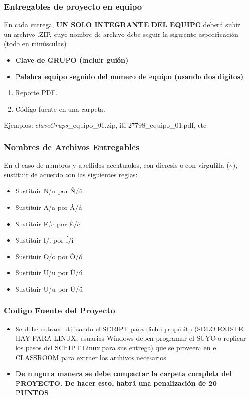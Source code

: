 \begin{frame}
\frametitle{Entregables de proyecto en equipo}
En cada entrega, \textbf{UN SOLO INTEGRANTE DEL EQUIPO} deberá subir un archivo .ZIP, cuyo nombre de archivo debe seguir la siguiente especificación (todo en minúsculas):
\begin{itemize}
\item \textbf{Clave de GRUPO (incluir guión)}
\item \textbf{Palabra equipo seguido del numero de equipo (usando dos digitos)}
\end{itemize}

\begin{enumerate}
\item Reporte PDF.
\item Código fuente en una carpeta.
\end{enumerate}
Ejemplos: \textit{claveGrupo}\_equipo\_01.zip, iti-27798\_equipo\_01.pdf, etc
\end{frame}

\begin{frame}
\frametitle{Nombres de Archivos Entregables}
En el caso de nombres y apellidos acentuados, con dieresis o con virgulilla (\textasciitilde{}), sustituir de acuerdo con las siguientes reglas:
\begin{itemize}
\item Sustituir N/n por \~N/\~n
\item Sustituir A/a por \'A/\'a
\item Sustituir E/e por \'E/\'e
\item Sustituir I/i por \'I/\'i
\item Sustituir O/o por \'O/\'o
\item Sustituir U/u por \'U/\'u
\item Sustituir U/u por \"U/\"u
\end{itemize}
\end{frame}
\begin{frame}
\frametitle{Codigo Fuente del Proyecto}
\begin{itemize}
\item Se debe extraer utilizando el SCRIPT para dicho prop\'osito (SOLO EXISTE HAY PARA LINUX, usuarios Windows deben programar el SUYO o replicar los pasos del SCRIPT Linux para sus entrega) que se proveerá en el CLASSROOM para extraer los archivos necesarios
\item \textbf{De ninguna manera se debe compactar la carpeta completa del PROYECTO. De hacer esto, habr\'a una penalizaci\'on de 20 PUNTOS}
\end{itemize}

\end{frame}


